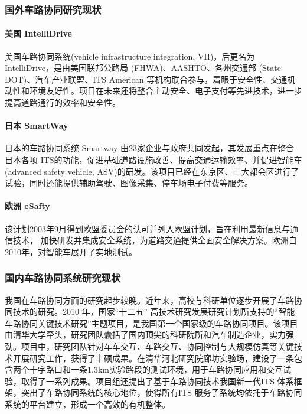     \subsubsection{国外车路协同研究现状}

    \paragraph{美国 IntelliDrive} 美国车路协同系统(vehicle infrastructure integration, VII)，后更名为 IntelliDrive，是由美国联邦公路局 (FHWA)、AASHTO、各州交通部 (State DOT)、汽车产业联盟、ITS American 等机构联合参与，着眼于安全性、交通机动性和环境友好性。项目在未来还将整合主动安全、电子支付等先进技术，进一步提高道路通行的效率和安全性。

    \paragraph{日本 SmartWay} 日本的车路协同系统 Smartway \cite{Hiroshi2005Smartway} 由23家企业与政府共同发起，其发展重点在整合日本各项 ITS的功能，促进基础道路设施改善、提高交通运输效率、并促进智能车(advanced safety vehicle, ASV)\cite{Chapman2010USING}的研发。该项目已经在东京区、三大都会区进行了试验，同时还能提供辅助驾驶、图像采集、停车场电子付费等服务。

    \paragraph{欧洲 eSafty} 该计划2003年9月得到欧盟委员会的认可并列入欧盟计划，旨在利用最新信息与通信技术，
    加快研发并集成安全系统，为道路交通提供全面安全解决方案。欧洲自2010年，对智能车展开了实地测试。

    \subsubsection{国内车路协同系统研究现状}
    我国在车路协同方面的研究起步较晚。近年来，高校与科研单位逐步开展了车路协同技术的研究\cite{Tian2010A,Danno2009VEHICLE}。2010 年，国家“十二五” 高技术研究发展研究计划所支持的“智能车路协同关键技术研究”主题项目，是我国第一个国家级的车路协同项目。该项目由清华大学牵头，研究团队囊括了国内顶尖的科研院所和汽车制造企业，实力强劲。项目中，研究团队针对车车交互、车路交互、协同控制与大规模仿真等关键技术开展研究工作，获得了丰硕成果。在清华河北研究院廊坊实验场，建设了一条包含两个十字路口和一条1.3km实验路段的测试环境，用于车路协同应用和交互试验，取得了一系列成果。项目组还提出了基于车路协同技术我国新一代ITS 体系框架，突出了车路协同系统的核心地位，使得所有ITS 服务子系统均依托于车路协同系统的平台建立，形成一个高效的有机整体。

